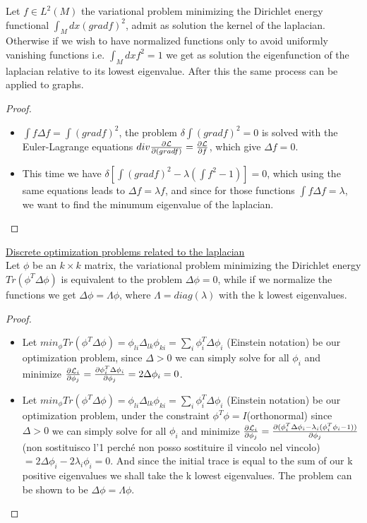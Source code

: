 \documentclass[../2.tex]{subfiles}
\begin{document}
{\color{red}
\begin{prop}
    Let $f \in L^2(M)$ the variational problem minimizing the Dirichlet energy functional $\int_M dx (gradf)^2$, 
    admit as solution the kernel of the laplacian. Otherwise if we wish to have normalized functions only
    to avoid uniformly vanishing functions i.e. $\int_M dx f^2 = 1$ we get as solution the eigenfunction of the laplacian
    relative to its lowest eigenvalue. After this the same process can be applied to graphs.
\end{prop}
\begin{proof} \hfill \\
    \begin{itemize}
        \item 
	$\int f \Delta f = \int (gradf)^2$, the problem $\delta \int (gradf)^2 = 0$ is solved with the
	Euler-Lagrange equations $div \frac{\partial \mathcal{L}}{\partial (gradf)}=\frac{\partial \mathcal{L}}{\partial f}$, which give $\Delta f = 0$.
	\item
	This time we have $\delta[\int (gradf)^2 - \lambda (\int f^2 -1)]=0$, which using the same equations
	leads to $\Delta f = \lambda f$, and since for those functions $\int f \Delta f = \lambda$, we want to find
	the minumum eigenvalue of the laplacian.
    \end{itemize}
\end{proof}

\begin{prop}
    \underline{Discrete optimization problems related to the laplacian}\\
    Let $\phi$ be an $k \times k$ matrix, the variational problem minimizing the Dirichlet energy $Tr(\phi^T \Delta \phi)$ is equivalent to
    the problem $\Delta \phi = 0$, while if we normalize the functions we get $\Delta \phi = \Lambda \phi$, where $\Lambda = diag(\lambda)$ with 
    the k lowest eigenvalues.
\end{prop}
\begin{proof} \hfill \\
    \begin{itemize}
        \item
	Let $min_{\phi}Tr(\phi^T \Delta \phi) = \phi_{li}\Delta_{lk}\phi_{ki} = \sum_i \phi_i^T \Delta \phi_i $ (Einstein notation) be our optimization problem,
	since $\Delta > 0$ we can simply solve for all $\phi_i$ and minimize $\frac{\partial \mathcal{L}_i}{\partial \phi_j} = \frac{\partial \phi_i^T \Delta \phi_i}{\partial \phi_j}
	 = 2\Delta\phi_i=0$.
	 \item
	Let $min_{\phi}Tr(\phi^T \Delta \phi) = \phi_{li}\Delta_{lk}\phi_{ki} = \sum_i \phi_i^T \Delta \phi_i $ (Einstein notation) be our optimization problem,
        under the constraint $\phi^T \phi = I$(orthonormal) since $\Delta > 0$ we can simply solve for all $\phi_i$ and minimize 
	$\frac{\partial \mathcal{L}_i}{\partial \phi_j} = \frac{\partial (\phi_i^T \Delta \phi_i -\lambda_i(\phi_i^T\phi_i -1))}{\partial \phi_j}$(non sostituisco l'1 perché non posso sostituire il vincolo 
	nel vincolo)$ = 2\Delta\phi_i-2\lambda_i\phi_i=0$. And since the initial trace is equal to the sum of our k positive eigenvalues we shall take the
	k lowest eigenvalues. The problem can be shown to be $\Delta \phi = \Lambda \phi$.
   \end{itemize}
\end{proof}

}
\end{document}
